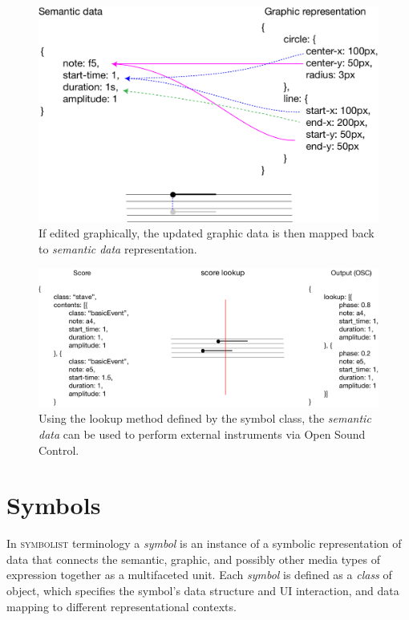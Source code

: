\documentclass{article}
\def\symbolist{\textsc{symbolist}\xspace}
\begin{document}
\begin{figure}[ht!]
\centering
\includegraphics[width=0.8\columnwidth]{graphic-to-data.pdf}
\caption{If edited graphically, the updated graphic data is then mapped back to \textit{semantic data} representation. 
\label{fig:graphic-to-data}}
\end{figure}

\begin{figure}[ht!]
\centering
\includegraphics[width=1\columnwidth]{score-lookup.pdf}
\caption{Using the lookup method defined by the symbol class, the \textit{semantic data} can be used to perform external instruments via Open Sound Control. 
\label{fig:score-lookup}}
\end{figure}



\section{Symbols}\label{subsec:symbols}

In \symbolist terminology a \textit{symbol} is an instance of a symbolic representation of data that connects the semantic, graphic, and possibly other media types of expression together as a multifaceted unit.
Each \textit{symbol} is defined as a \textit{class} of object, which specifies the symbol's data structure and UI interaction, and data mapping to different representational contexts.
\end{document}
